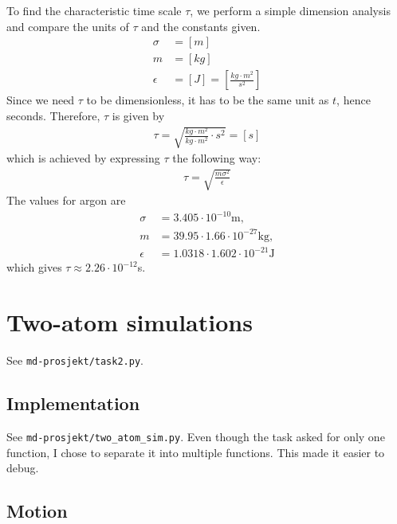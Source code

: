 \documentclass[a4paper,10pt,english]{article}
\begin{document}
To find the characteristic time scale $\tau$, we perform a simple dimension analysis and compare the units of $\tau$ and the constants given.
\begin{align*}
    \sigma &= [m] \\
    m &= [kg] \\
    \epsilon &= [J] = \left[ \frac{kg \cdot m^2}{s^2} \right]
\end{align*}
Since we need $\tau$ to be dimensionless, it has to be the same unit as $t$, hence seconds. Therefore, $\tau$ is given by
\begin{align*}
    \tau = \sqrt{\frac{kg \cdot m^2}{kg \cdot m^2} \cdot s^2} = [s]
\end{align*}
which is achieved by expressing $\tau$ the following way:
\begin{align}
    \tau = \sqrt{\frac{m\sigma^2}{\epsilon}}
\end{align}
The values for argon are 
\begin{align*}
    \sigma &= 3.405 \cdot 10^{-10} \text{m}, \\
    m &= 39.95 \cdot 1.66 \cdot 10^{-27} \text{kg}, \\
    \epsilon &= 1.0318 \cdot 1.602 \cdot 10^{-21} \text{J}
\end{align*}
which gives $\tau \approx 2.26 \cdot 10^{-12}$s.

\newpage

\section{Two-atom simulations} \label{2}

See \verb|md-prosjekt/task2.py|.

\subsection{Implementation} \label{2a}

See \verb|md-prosjekt/two_atom_sim.py|. Even though the task asked for only one function, I chose to separate it into multiple functions. This made it easier to debug.

\subsection{Motion} \label{2b}
\end{document}
